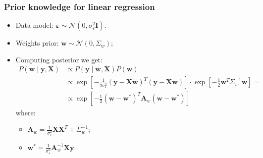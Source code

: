 \documentclass[usenames,dvipsnames,aspectratio=169]{beamer}
\begin{document}
\begin{frame}
\frametitle{Prior knowledge for linear regression}

\begin{itemize}

  \item Data model:
  $\bm{\varepsilon} \sim \mathcal{N}(0, \sigma^2_\varepsilon\bm{I}).$

  \pause
  \item Weights prior: $\mathbf{w} \sim \mathcal{N}(0, \Sigma_w)$;

  \pause
  \item Computing posterior we get:
  \begin{align*}
    P(\mathbf{w} \mid \bm{y}, \bm{X}) 
        &\propto P(\bm{y} \mid \mathbf{w}, \bm{X}) P(\mathbf{w}) \\
        &\propto \exp\left[
            -\frac{1}{2 \sigma^2_\varepsilon} 
            (\bm{y} - \bm{X} \mathbf{w})^T (\bm{y} - \bm{X} \mathbf{w}) 
        \right] 
        \cdot 
        \exp\left[ 
            -\frac{1}{2} \mathbf{w}^T \Sigma^{-1}_w \mathbf{w} 
        \right] = \\
        &\propto \exp\left[ 
            -\frac{1}{2} (\mathbf{w} - \mathbf{w}^*)^T \bm{A}_w (\mathbf{w} - \mathbf{w}^*) 
        \right]
  \end{align*}
  where:
  \begin{itemize}
    \item $\bm{A}_w = 
        \frac{1}{\sigma^{2}_\varepsilon}\bm{X} \bm{X}^T + \Sigma^{-1}_w$;

    \item $\mathbf{w}^* = \frac{1}{\sigma^{2}_\varepsilon} \bm{A}^{-1}_w \bm{X} \bm{y}$.
  \end{itemize}
\end{itemize}

\end{frame}










\end{document}
